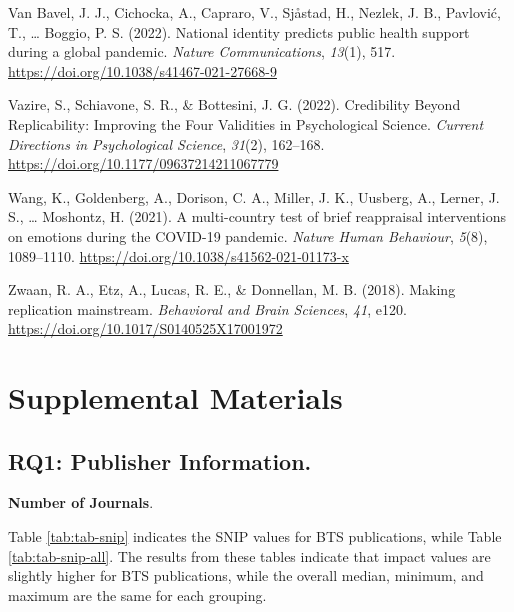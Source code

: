 \documentclass[
  man,floatsintext]{apa6}
\newlength{\cslhangindent}
\newlength{\cslentryspacingunit} %
\newenvironment{CSLReferences}[2] %
 {%
  \setlength{\parindent}{0pt}
  \ifodd #1
  \let\oldpar\par
  \def\par{\hangindent=\cslhangindent\oldpar}
  \fi
  \setlength{\parskip}{#2\cslentryspacingunit}
 }%
 {}
\begin{document}
\begin{CSLReferences}{1}{0}
\leavevmode{}%
Van Bavel, J. J., Cichocka, A., Capraro, V., Sjåstad, H., Nezlek, J. B., Pavlović, T., \ldots{} Boggio, P. S. (2022). National identity predicts public health support during a global pandemic. \emph{Nature Communications}, \emph{13}(1), 517. \url{https://doi.org/10.1038/s41467-021-27668-9}

\leavevmode{}%
Vazire, S., Schiavone, S. R., \& Bottesini, J. G. (2022). Credibility Beyond Replicability: Improving the Four Validities in Psychological Science. \emph{Current Directions in Psychological Science}, \emph{31}(2), 162--168. \url{https://doi.org/10.1177/09637214211067779}

\leavevmode{}%
Wang, K., Goldenberg, A., Dorison, C. A., Miller, J. K., Uusberg, A., Lerner, J. S., \ldots{} Moshontz, H. (2021). A multi-country test of brief reappraisal interventions on emotions during the COVID-19 pandemic. \emph{Nature Human Behaviour}, \emph{5}(8), 1089--1110. \url{https://doi.org/10.1038/s41562-021-01173-x}

\leavevmode{}%
Zwaan, R. A., Etz, A., Lucas, R. E., \& Donnellan, M. B. (2018). Making replication mainstream. \emph{Behavioral and Brain Sciences}, \emph{41}, e120. \url{https://doi.org/10.1017/S0140525X17001972}

\end{CSLReferences}

\endgroup

\newpage

\hypertarget{appendix-appendix}{%
\appendix}


\hypertarget{supplemental-materials}{%
\section{Supplemental Materials}\label{supplemental-materials}}

\hypertarget{rq1-publisher-information.-2}{%
\subsection{RQ1: Publisher Information.}\label{rq1-publisher-information.-2}}

\textbf{Number of Journals}.

Table \ref{tab:tab-snip} indicates the SNIP values for BTS publications, while Table \ref{tab:tab-snip-all}. The results from these tables indicate that impact values are slightly higher for BTS publications, while the overall median, minimum, and maximum are the same for each grouping.
\end{document}
